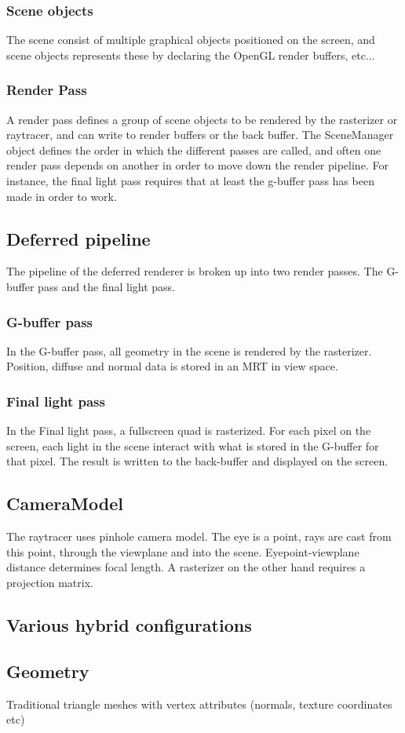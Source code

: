 \subsubsection{Scene objects}
The scene consist of multiple graphical objects positioned on the screen, and scene objects represents these by declaring the OpenGL render buffers, etc...

\subsubsection{Render Pass}
A render pass defines a group of scene objects to be rendered by the rasterizer or raytracer, and can write to render buffers or the back buffer. The SceneManager object defines the order in which the different passes are called, and often one render pass depends on another in order to move down the render pipeline. For instance, the final light pass requires that at least the g-buffer pass has been made in order to work.

\subsection{Deferred pipeline}
The pipeline of the deferred renderer is broken up into two render passes. The G-buffer pass and the final light pass.

\subsubsection{G-buffer pass}
In the G-buffer pass, all geometry in the scene is rendered by the rasterizer. Position, diffuse and normal data is stored in an MRT in view space.

\subsubsection{Final light pass}
In the Final light pass, a fullscreen quad is rasterized. For each pixel on the screen, each light in the scene interact with what is stored in the G-buffer for that pixel. The result is written to the back-buffer and displayed on the screen.

\subsection{CameraModel}
The raytracer uses pinhole camera model. The eye is a point, rays are cast from this point, through the viewplane and into the scene. Eyepoint-viewplane distance determines focal length. A rasterizer on the other hand requires a projection matrix.

\subsection{Various hybrid configurations}

\subsection{Geometry}
Traditional triangle meshes with vertex attributes (normals, texture coordinates etc)

